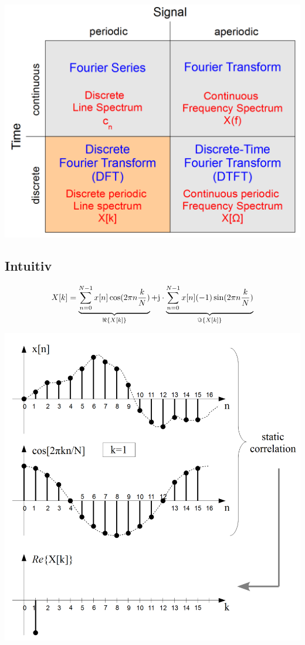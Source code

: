 \begin{center}
	\includegraphics[scale=.7]{../fig/fft_methods}
\end{center}

\subsection{Intuitiv}
\[ X[k]=\underbrace{\sum_{n=0}^{N-1}x[n]\cos(2\pi n\frac{k}{N})}_{\Re\{X[k]\}}
	+ \im \cdot \underbrace{\sum_{n=0}^{N-1}x[n](-1)\sin(2\pi n \frac{k}{N})}_
	{\Im\{X[k]\}} \]

\begin{center}
	\includegraphics[scale=.7]{../fig/dft_intuitiv}
\end{center}

